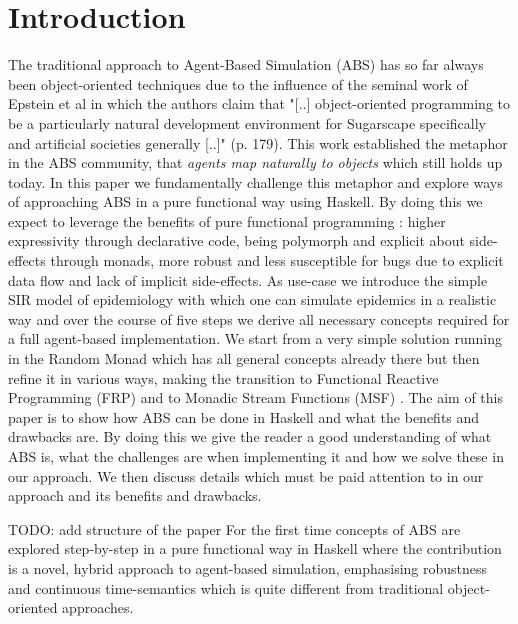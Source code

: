 \section{Introduction}
The traditional approach to Agent-Based Simulation (ABS) has so far always been object-oriented techniques due to the influence of the seminal work of Epstein et al \cite{epstein_growing_1996} in which the authors claim that "[..] object-oriented programming to be a particularly natural development environment for Sugarscape specifically and artificial societies generally [..]" (p. 179). This work established the metaphor in the ABS community, that \textit{agents map naturally to objects} \cite{north_managing_2007} which still holds up today.
In this paper we fundamentally challenge this metaphor and explore ways of approaching ABS in a pure functional way using Haskell. By doing this we expect to leverage the benefits of pure functional programming \cite{hudak_history_2007}: higher expressivity through declarative code, being polymorph and explicit about side-effects through monads, more robust and less susceptible for bugs due to explicit data flow and lack of implicit side-effects.
As use-case we introduce the simple SIR model of epidemiology with which one can simulate epidemics in a realistic way and over the course of five steps we derive all necessary concepts required for a full agent-based implementation. We start from a very simple solution running in the Random Monad which has all general concepts already there but then refine it in various ways, making the transition to Functional Reactive Programming (FRP) \cite{wan_functional_2000} and to Monadic Stream Functions (MSF) \cite{perez_functional_2016}.
The aim of this paper is to show how ABS can be done in Haskell and what the benefits and drawbacks are. By doing this we give the reader a good understanding of what ABS is, what the challenges are when implementing it and how we solve these in our approach. We then discuss details which must be paid attention to in our approach and its benefits and drawbacks. 

TODO: add structure of the paper 
For the first time concepts of ABS are explored step-by-step in a pure functional way in Haskell where the contribution is a novel, hybrid approach to agent-based simulation, emphasising robustness and continuous time-semantics which is quite different from traditional object-oriented approaches.

